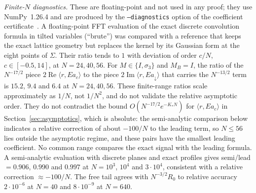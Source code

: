 \documentclass[11pt]{amsart}
\theoremstyle{definition}
\theoremstyle{remark}
\newcommand{\dn}{{\downarrow}}
\newcommand{\re}{\operatorname{Re}}
\newcommand{\im}{\operatorname{Im}}
\begin{document}
\medskip\noindent\emph{Finite-$N$ diagnostics.}  These are floating-point
and not used in any proof; they use NumPy~1.26.4 and are produced by the
\texttt{--diagnostics} option of the coefficient certificate~\cite{Repo}.  A
floating-point FFT evaluation of the exact discrete convolution formula in
tilted variables (``brute'') was compared with a reference that keeps the
exact lattice geometry but replaces the kernel by its Gaussian form at the
eight points of $\Sigma$.  Their ratio tends to $1$ with deviation of order
$c/N$, $c\in[-0.5,14]$, at $N=24,40,56$.  For $M\in\{I,\sigma_3\}$ and
$M_B=I$, the ratio of the $N^{-17/2}$ piece $2\re\langle r,Ea_c\rangle$ to
the piece $2\im\langle r,Ea_\dn\rangle$ that carries the $N^{-13/2}$ term is
$15.2$, $9.4$ and $6.4$ at $N=24,40,56$. These finite-range ratios scale
approximately as $1/N$, not $1/N^2$, and do not validate the relative
asymptotic order. They do not contradict the bound
$O(N^{-17/2}e^{-K_*N})$ for $\langle r,Ea_c\rangle$ in
Section~\ref{sec:asymptotics}, which is absolute: the semi-analytic
comparison below indicates a relative correction of about $-100/N$ to the
leading term, so $N\le56$ lies outside the asymptotic regime, and these
pairs have the smallest leading coefficient. No common range compares the exact signal with the
leading formula. A semi-analytic evaluation with discrete
planes and exact profiles gives semi/lead $=0.906$, $0.990$ and $0.997$ at
$N=10^3$, $10^4$ and $3\cdot10^4$, consistent with a relative correction
$\approx-100/N$.  The free tail agrees with $N^{-3/2}R_0$ to relative
accuracy $2\cdot10^{-6}$ at $N=40$ and $8\cdot10^{-9}$ at $N=640$.
\end{document}
